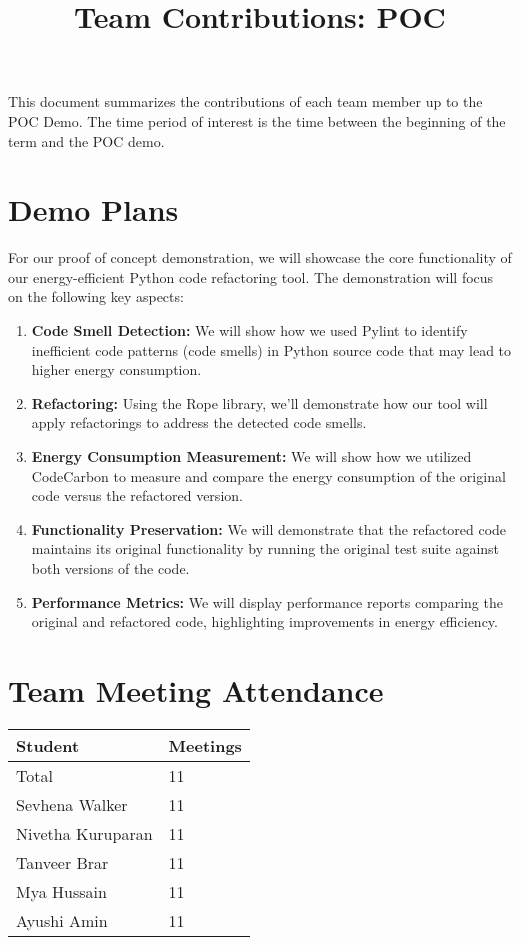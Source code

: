 \documentclass{article}
\title{Team Contributions: POC\\\progname}
\author{\authname}
\date{}
\begin{document}
\maketitle

This document summarizes the contributions of each team member up to the POC
Demo.  The time period of interest is the time between the beginning of the term
and the POC demo.

\section{Demo Plans}

For our proof of concept demonstration, we will showcase the core functionality of our energy-efficient 
Python code refactoring tool. The demonstration will focus on the following key aspects:
\begin{enumerate}

    \item \textbf{Code Smell Detection:} We will show how we used Pylint to identify inefficient code 
    patterns (code smells) in Python source code that may lead to higher energy consumption.
    \item \textbf{Refactoring:} Using the Rope library, we'll demonstrate how our tool will 
    apply refactorings to address the detected code smells.
    \item \textbf{Energy Consumption Measurement:} We will show how we utilized CodeCarbon to measure 
    and compare the energy consumption of the original code versus the refactored version.
    \item \textbf{Functionality Preservation:} We will demonstrate that the refactored code 
    maintains its original functionality by running the original test suite against both versions of the code.
    \item \textbf{Performance Metrics:} We will display performance reports comparing the original and refactored 
    code, highlighting improvements in energy efficiency.
    
\end{enumerate}

\section{Team Meeting Attendance}

\begin{table}[H]
\centering
\begin{tabular}{ll}
\toprule
\textbf{Student} & \textbf{Meetings}\\
\midrule
Total & 11\\
Sevhena Walker & 11\\
Nivetha Kuruparan & 11\\
Tanveer Brar & 11\\
Mya Hussain & 11\\
Ayushi Amin & 11\\
\bottomrule
\end{tabular}
\end{table}
\end{document}
